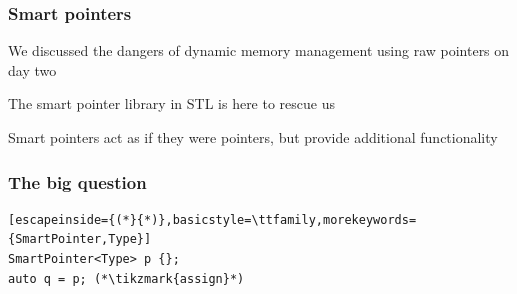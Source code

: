 \documentclass[14pt,a4paper,dvipsnames,usenames]{beamer}
\begin{document}
\begin{frame}[fragile]
  \frametitle{Smart pointers}

  We discussed the dangers of dynamic memory management using raw pointers on day two

  \vspace{1cm}
  The smart pointer library in STL is here to rescue us

  \vspace{1cm}
  Smart pointers act as if they were pointers, but provide additional functionality

  \CPPEleven

  
\end{frame}

\begin{frame}[fragile]
  \frametitle{The big question}

  \begin{lstlisting}[escapeinside={(*}{*)},basicstyle=\ttfamily,morekeywords={SmartPointer,Type}]
SmartPointer<Type> p {};
auto q = p; (*\tikzmark{assign}*)
  \end{lstlisting}

  \nointerlineskip

  \CPPEleven

  
\end{frame}
\end{document}
